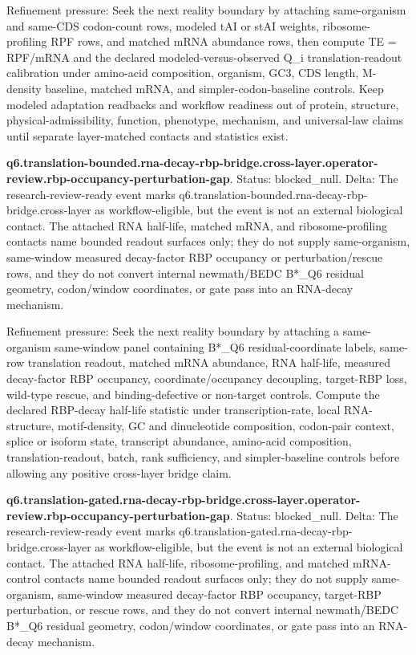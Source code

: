 Refinement pressure: Seek the next reality boundary by attaching same-organism and same-CDS codon-count rows, modeled tAI or stAI weights, ribosome-profiling RPF rows, and matched mRNA abundance rows, then compute TE = RPF/mRNA and the declared modeled-versus-observed Q\_i translation-readout calibration under amino-acid composition, organism, GC3, CDS length, M-density baseline, matched mRNA, and simpler-codon-baseline controls. Keep modeled adaptation readbacks and workflow readiness out of protein, structure, physical-admissibility, function, phenotype, mechanism, and universal-law claims until separate layer-matched contacts and statistics exist.

\textbf{q6.translation-bounded.rna-decay-rbp-bridge.cross-layer.operator-review.rbp-occupancy-perturbation-gap}. Status: blocked\_null. Delta: The research-review-ready event marks q6.translation-bounded.rna-decay-rbp-bridge.cross-layer as workflow-eligible, but the event is not an external biological contact. The attached RNA half-life, matched mRNA, and ribosome-profiling contacts name bounded readout surfaces only; they do not supply same-organism, same-window measured decay-factor RBP occupancy or perturbation/rescue rows, and they do not convert internal newmath/BEDC B*\_Q6 residual geometry, codon/window coordinates, or gate pass into an RNA-decay mechanism.

Refinement pressure: Seek the next reality boundary by attaching a same-organism same-window panel containing B*\_Q6 residual-coordinate labels, same-row translation readout, matched mRNA abundance, RNA half-life, measured decay-factor RBP occupancy, coordinate/occupancy decoupling, target-RBP loss, wild-type rescue, and binding-defective or non-target controls. Compute the declared RBP-decay half-life statistic under transcription-rate, local RNA-structure, motif-density, GC and dinucleotide composition, codon-pair context, splice or isoform state, transcript abundance, amino-acid composition, translation-readout, batch, rank sufficiency, and simpler-baseline controls before allowing any positive cross-layer bridge claim.

\textbf{q6.translation-gated.rna-decay-rbp-bridge.cross-layer.operator-review.rbp-occupancy-perturbation-gap}. Status: blocked\_null. Delta: The research-review-ready event marks q6.translation-gated.rna-decay-rbp-bridge.cross-layer as workflow-eligible, but the event is not an external biological contact. The attached RNA half-life, ribosome-profiling, and matched mRNA-control contacts name bounded readout surfaces only; they do not supply same-organism, same-window measured decay-factor RBP occupancy, target-RBP perturbation, or rescue rows, and they do not convert internal newmath/BEDC B*\_Q6 residual geometry, codon/window coordinates, or gate pass into an RNA-decay mechanism.

